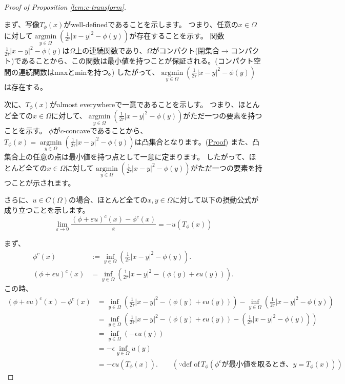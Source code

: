 \documentclass{jsarticle}
\theoremstyle{definition}
\begin{document}
\begin{proof}[Proof of Proposition \ref{lem:c-transform}]
    \hypertarget{proof:prop:transport map}{}
    \quad\par
    まず、写像$T_\phi(x)$がwell-definedであることを示します。
    つまり、任意の$x \in \Omega$に対して$\underset{y \in \Omega} {\operatorname{argmin}}\left( \frac{1}{2 \tau} |x - y|^2 - \phi(y) \right)$が存在することを示す。
    関数$\frac{1}{2 \tau} |x - y|^2 - \phi(y)$は$\Omega$上の連続関数であり、$\Omega$がコンパクト(閉集合$\to$コンパクト)であることから、この関数は最小値を持つことが保証される。(コンパクト空間の連続関数はmaxとminを持つ。)
    したがって、$\underset{y \in \Omega} {\operatorname{argmin}}\left( \frac{1}{2 \tau} |x - y|^2 - \phi(y) \right)$は存在する。
    
    次に、$T_\phi(x)$がalmost everywhereで一意であることを示しす。
    つまり、ほとんど全ての$x \in \Omega$に対して、$\underset{y \in \Omega} {\operatorname{argmin}}\left( \frac{1}{2 \tau} |x - y|^2 - \phi(y) \right)$がただ一つの要素を持つことを示す。
    $\phi$が$c$-concaveであることから、\hypertarget{convex set of T}{$T_\phi(x) = \underset{y \in \Omega} {\operatorname{argmin}}\left( \frac{1}{2 \tau} |x - y|^2 - \phi(y) \right)$は凸集合}となります。(\hyperlink{convex set}{Proof}) 
    また、凸集合上の任意の点は最小値を持つ点として一意に定まります。
    したがって、ほとんど全ての$x \in \Omega$に対して$\underset{y \in \Omega} {\operatorname{argmin}}\left( \frac{1}{2 \tau} |x - y|^2 - \phi(y) \right)$がただ一つの要素を持つことが示されます。
    
    {\color{teal}
    さらに、$u \in C(\Omega)$の場合、ほとんど全ての$x, y \in \Omega$に対して以下の摂動公式が成り立つことを示します。
    }
    $$
    \lim_{\varepsilon \to 0} \frac{(\phi + \varepsilon u)^c(x) - \phi^c(x)}{\varepsilon} = - u(T_\phi(x))
    $$


    まず、
    \begin{align*}
        \phi^c(x) &:= \inf_{y\in\Omega} \left(\frac{1}{2 \tau}|x - y|^2 - \phi(y)\right).\\
        (\phi + \epsilon u)^c(x) &= \inf_{y\in\Omega} \left(\frac{1}{2 \tau}|x - y|^2 - (\phi(y) + \epsilon u(y))\right).
        \end{align*}
    この時、
    \begin{align*}
    (\phi + \epsilon u)^c(x) - \phi^c(x) &= \inf_{y\in\Omega} \left(\frac{1}{2 \tau}|x - y|^2 - (\phi(y) + \epsilon u(y))\right) - \inf_{y\in\Omega} \left(\frac{1}{2 \tau}|x - y|^2 - \phi(y)\right) \\
    &= \inf_{y\in\Omega} \left(\frac{1}{2 \tau}|x - y|^2 - (\phi(y) + \epsilon u(y)) - \left(\frac{1}{2 \tau}|x - y|^2 - \phi(y)\right)\right) \\
    &= \inf_{y\in\Omega} \left(-\epsilon u(y)\right) \\
    &= -\epsilon \inf_{y\in\Omega} u(y) \\
    &= -\epsilon u \left(T_\phi(x)\right).  \qquad (\because \text{def of}\,  T_\phi (\text{$\phi^c$が最小値を取るとき、$y = T_\phi(x)$}))
    \end{align*}
    

\end{proof}
\end{document}
